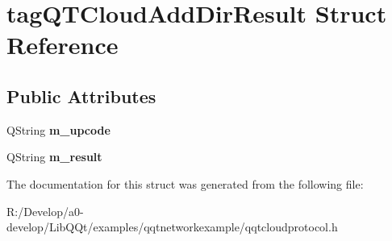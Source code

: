 \hypertarget{structtag_q_t_cloud_add_dir_result}{}\section{tag\+Q\+T\+Cloud\+Add\+Dir\+Result Struct Reference}
\label{structtag_q_t_cloud_add_dir_result}
\subsection*{Public Attributes}
\begin{DoxyCompactItemize}
\item 
\mbox{\label{structtag_q_t_cloud_add_dir_result_a0a9cf32af70cdad230cb1a0d769adc1e}} 
Q\+String {\bfseries m\+\_\+upcode}
\item 
\mbox{\label{structtag_q_t_cloud_add_dir_result_aecaa69accf75385252466d6c623872de}} 
Q\+String {\bfseries m\+\_\+result}
\end{DoxyCompactItemize}


The documentation for this struct was generated from the following file\+:\begin{DoxyCompactItemize}
\item 
R\+:/\+Develop/a0-\/develop/\+Lib\+Q\+Qt/examples/qqtnetworkexample/qqtcloudprotocol.\+h\end{DoxyCompactItemize}
